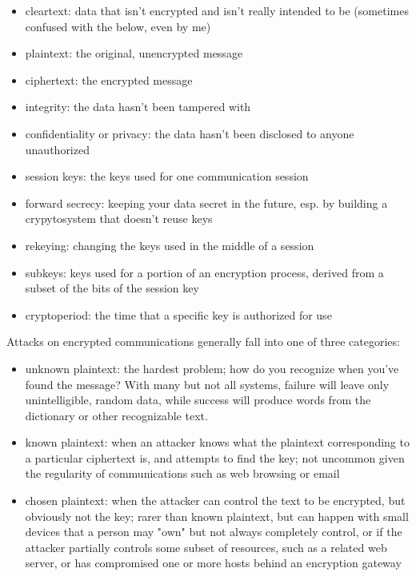 \documentclass[%
 aip,
 jmp,%
 amsmath,amssymb,
 reprint,%
]{revtex4-1}
\begin{document}
\begin{itemize}
\item cleartext: data that isn't encrypted and isn't really intended to be
  (sometimes confused with the below, even by me)
\item plaintext: the original, unencrypted message
\item ciphertext: the encrypted message
\item integrity: the data hasn't been tampered with
\item confidentiality or privacy: the data hasn't been disclosed to anyone unauthorized
\item session keys: the keys used for one communication session
\item forward secrecy: keeping your data secret in the future, esp. by
  building a crypytosystem that doesn't reuse keys
\item rekeying: changing the keys used in the middle of a session
\item subkeys: keys used for a portion of an encryption process, derived
  from a subset of the bits of the session key
\item cryptoperiod: the time that a specific key is authorized for use
\end{itemize}

Attacks on encrypted communications generally fall into one of three
categories:

\begin{itemize}
\item unknown plaintext: the hardest problem; how do you recognize when
  you've found the message?  With many but not all systems, failure
  will leave only unintelligible, random data, while success will
  produce words from the dictionary or other recognizable text.
\item known plaintext: when an attacker knows what the plaintext
  corresponding to a particular ciphertext is, and attempts to find
  the key; not uncommon given the regularity of communications such as
  web browsing or email
\item chosen plaintext: when the attacker can control the text to be
  encrypted, but obviously not the key; rarer than known plaintext,
  but can happen with small devices that a person may "own" but not
  always completely control, or if the attacker partially controls
  some subset of resources, such as a related web server, or has
  compromised one or more hosts behind an encryption gateway
\end{itemize}
\end{document}
